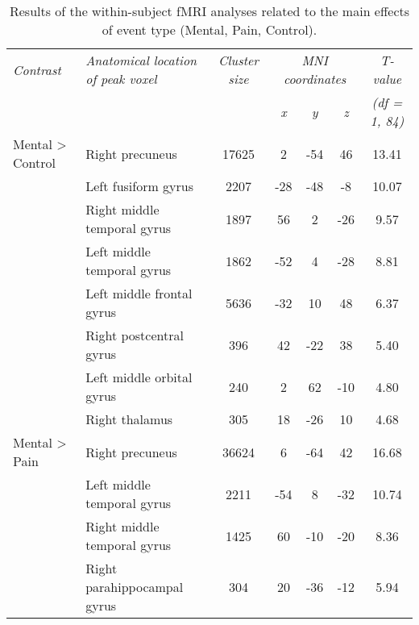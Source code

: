 \begin{table}[ht]
    \centering
    \captionsetup{justification=raggedright, singlelinecheck=false, font = normal} %
    \setlength{\tabcolsep}{3pt} %
    \renewcommand{\arraystretch}{1.5} %
    \caption{Results of the within-subject fMRI analyses related to the main effects of event type (Mental, Pain, Control).}
    \label{tab:fmri_analyses}
    \small
    \begin{tabular}{llccccc}
    \hline
    \textit{Contrast} & \textit{Anatomical location of peak voxel} & \textit{Cluster size} & \multicolumn{3}{c}{\textit{MNI coordinates}} & \textit{T-value} \\
     &  &  & \textit{x} & \textit{y} & \textit{z} & \textit{(df = 1, 84)} \\
    \hline
    Mental > Control & Right precuneus & 17625 & 2 & -54 & 46 & 13.41 \\
     & Left fusiform gyrus & 2207 & -28 & -48 & -8 & 10.07 \\
     & Right middle temporal gyrus & 1897 & 56 & 2 & -26 & 9.57 \\
     & Left middle temporal gyrus & 1862 & -52 & 4 & -28 & 8.81 \\
     & Left middle frontal gyrus & 5636 & -32 & 10 & 48 & 6.37 \\
     & Right postcentral gyrus & 396 & 42 & -22 & 38 & 5.40 \\
     & Left middle orbital gyrus & 240 & 2 & 62 & -10 & 4.80 \\
     & Right thalamus & 305 & 18 & -26 & 10 & 4.68 \\
    Mental > Pain & Right precuneus & 36624 & 6 & -64 & 42 & 16.68 \\
     & Left middle temporal gyrus & 2211 & -54 & 8 & -32 & 10.74 \\
     & Right middle temporal gyrus & 1425 & 60 & -10 & -20 & 8.36 \\
     & Right parahippocampal gyrus & 304 & 20 & -36 & -12 & 5.94 \\
    \hline
    \end{tabular}
    \normalsize
\end{table}

\newpage



\vspace{10pt}


